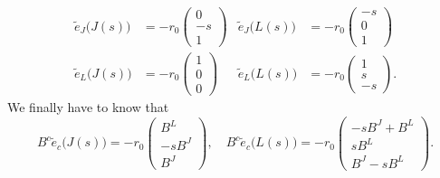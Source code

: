 \begin{subequations}
	\begin{align}
		\tilde{e}_J\big( J(s) \big) & =-r_0\begin{pmatrix}
			                                   0 \\-s\\1
		                                   \end{pmatrix}
		                            &
		\tilde{e}_J\big( L(s) \big) & =-r_0\begin{pmatrix}
			                                   -s \\0\\1
		                                   \end{pmatrix} \\
		\tilde{e}_L\big( J(s) \big) & =-r_0\begin{pmatrix}
			                                   1 \\0\\0
		                                   \end{pmatrix}
		                            &
		\tilde{e}_L\big( L(s) \big) & =-r_0\begin{pmatrix}
			                                   1 \\s\\-s
		                                   \end{pmatrix}.
	\end{align}
\end{subequations}
We finally have to know that
\[
	B^c\tilde{e}_c\big( J(s) \big)=-r_0\begin{pmatrix}
		B^L \\-sB^J\\B^J
	\end{pmatrix},
	\quad
	B^c\tilde{e}_c\big( L(s) \big)=-r_0\begin{pmatrix}
		-sB^J+B^L \\sB^L\\B^J-sB^L
	\end{pmatrix}.
\]

